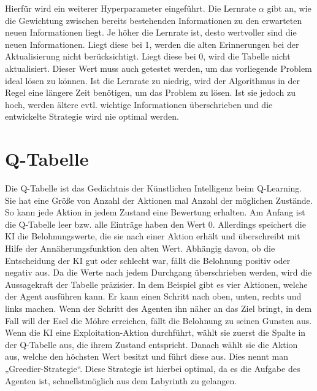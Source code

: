 \documentclass[12pt,titlepage]{article}
\begin{document}
Hierfür wird ein weiterer Hyperparameter eingeführt. Die Lernrate $\alpha$ gibt an, wie die Gewichtung zwischen bereits bestehenden Informationen zu den erwarteten neuen Informationen liegt. Je höher die Lernrate ist, desto wertvoller sind die neuen Informationen. Liegt diese bei 1, werden die alten Erinnerungen bei der Aktualisierung nicht berücksichtigt. Liegt diese bei 0, wird die Tabelle nicht aktualisiert. Dieser Wert muss auch getestet werden, um das vorliegende Problem ideal lösen zu können. Ist die Lernrate zu niedrig, wird der Algorithmus in der Regel eine längere Zeit benötigen, um das Problem zu lösen. Ist sie jedoch zu hoch, werden ältere evtl. wichtige Informationen überschrieben und die entwickelte Strategie wird nie optimal werden.

\section{Q-Tabelle}
Die Q-Tabelle ist das Gedächtnis der Künstlichen Intelligenz beim Q-Learning. 
Sie hat eine Größe von Anzahl der Aktionen mal Anzahl der möglichen Zustände. So kann jede Aktion in jedem Zustand eine Bewertung erhalten.
Am Anfang ist die Q-Tabelle leer bzw. alle Einträge haben den Wert 0. 
Allerdings speichert die KI die Belohnungswerte, die sie nach einer Aktion erhält und überschreibt mit Hilfe der Annäherungsfunktion den alten Wert. Abhängig davon, ob die Entscheidung der KI gut oder schlecht war, fällt die Belohnung positiv oder negativ aus. Da die Werte nach jedem Durchgang überschrieben werden, wird die Aussagekraft der Tabelle präzisier. In dem Beispiel gibt es vier Aktionen, welche der Agent ausführen kann. Er kann einen Schritt nach oben, unten, rechts und links machen. Wenn der Schritt des Agenten ihn näher an das Ziel bringt, in dem Fall will der Esel die Möhre erreichen, fällt die Belohnung zu seinen Gunsten aus. Wenn die KI eine Exploitation-Aktion durchführt, wählt sie zuerst die Spalte in der 
Q-Tabelle aus, die ihrem Zustand entspricht. Danach wählt sie die Aktion aus, welche den höchsten Wert besitzt und führt diese aus. Dies nennt man „Greedier-Strategie“. Diese Strategie ist hierbei optimal, da es die Aufgabe des Agenten ist, schnellstmöglich aus dem Labyrinth zu gelangen.
\\\\
\end{document}
